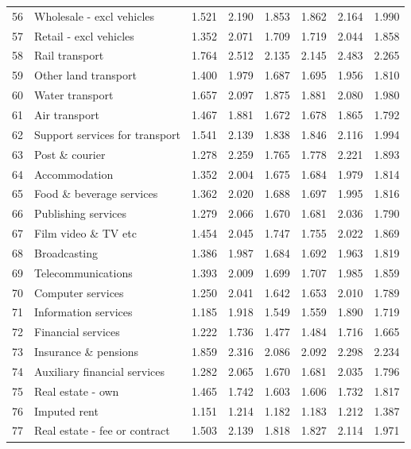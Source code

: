 \begin{longtable}{@{\extracolsep{\fill}}rlrrrrrr@{}}
    56    & Wholesale - excl vehicles & 1.521 & 2.190 & 1.853 & 1.862 & 2.164 & 1.990 \\
    57    & Retail - excl vehicles & 1.352 & 2.071 & 1.709 & 1.719 & 2.044 & 1.858 \\
    58    & Rail transport & 1.764 & 2.512 & 2.135 & 2.145 & 2.483 & 2.265 \\
    59    & Other land transport & 1.400 & 1.979 & 1.687 & 1.695 & 1.956 & 1.810 \\
    60    & Water transport & 1.657 & 2.097 & 1.875 & 1.881 & 2.080 & 1.980 \\
    61    & Air transport & 1.467 & 1.881 & 1.672 & 1.678 & 1.865 & 1.792 \\
    62    & Support services for transport & 1.541 & 2.139 & 1.838 & 1.846 & 2.116 & 1.994 \\
    63    & Post \& courier & 1.278 & 2.259 & 1.765 & 1.778 & 2.221 & 1.893 \\
    64    & Accommodation & 1.352 & 2.004 & 1.675 & 1.684 & 1.979 & 1.814 \\
    65    & Food \& beverage services & 1.362 & 2.020 & 1.688 & 1.697 & 1.995 & 1.816 \\
    66    & Publishing services & 1.279 & 2.066 & 1.670 & 1.681 & 2.036 & 1.790 \\
    67    & Film video \& TV etc & 1.454 & 2.045 & 1.747 & 1.755 & 2.022 & 1.869 \\
    68    & Broadcasting & 1.386 & 1.987 & 1.684 & 1.692 & 1.963 & 1.819 \\
    69    & Telecommunications & 1.393 & 2.009 & 1.699 & 1.707 & 1.985 & 1.859 \\
    70    & Computer services & 1.250 & 2.041 & 1.642 & 1.653 & 2.010 & 1.789 \\
    71    & Information services & 1.185 & 1.918 & 1.549 & 1.559 & 1.890 & 1.719 \\
    72    & Financial services & 1.222 & 1.736 & 1.477 & 1.484 & 1.716 & 1.665 \\
    73    & Insurance \& pensions & 1.859 & 2.316 & 2.086 & 2.092 & 2.298 & 2.234 \\
    74    & Auxiliary financial services & 1.282 & 2.065 & 1.670 & 1.681 & 2.035 & 1.796 \\
    75    & Real estate - own & 1.465 & 1.742 & 1.603 & 1.606 & 1.732 & 1.817 \\
    76    & Imputed rent & 1.151 & 1.214 & 1.182 & 1.183 & 1.212 & 1.387 \\
    77    & Real estate - fee or contract & 1.503 & 2.139 & 1.818 & 1.827 & 2.114 & 1.971 \\

\end{longtable}
